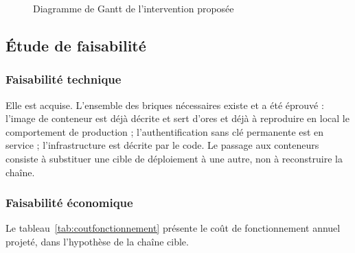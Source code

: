 \begin{figure}[htbp]
\centering
{}
\caption{Diagramme de Gantt de l'intervention proposée}
\label{fig:gantt}
\end{figure}

\subsection{Étude de faisabilité}

\subsubsection{Faisabilité technique}

Elle est acquise. L'ensemble des briques nécessaires existe et a été éprouvé :
l'image de conteneur est déjà décrite et sert d'ores et déjà à reproduire en
local le comportement de production ; l'authentification sans clé permanente est
en service ; l'infrastructure est décrite par le code. Le passage aux conteneurs
consiste à substituer une cible de déploiement à une autre, non à reconstruire
la chaîne.

\subsubsection{Faisabilité économique}

Le tableau~\ref{tab:coutfonctionnement} présente le coût de fonctionnement
annuel projeté, dans l'hypothèse de la chaîne cible.

